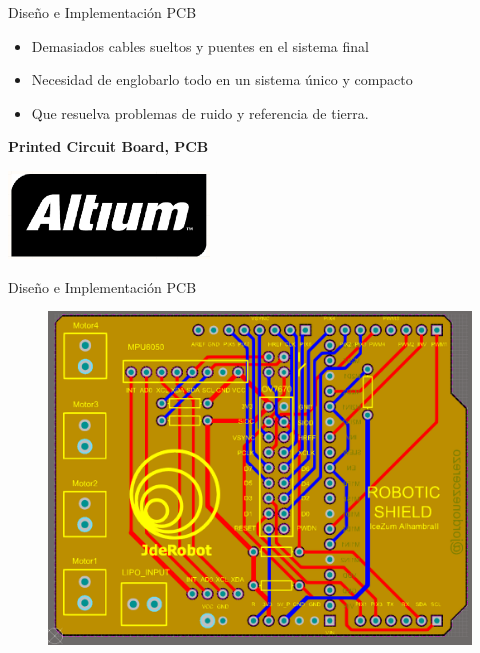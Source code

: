 \documentclass{beamer}
\begin{document}
\begin{frame}{Diseño e Implementación PCB}
\begin{block}{}
	\begin{itemize}
		\item Demasiados cables sueltos y puentes en el sistema final \pause
		\item Necesidad de englobarlo todo en un sistema único y compacto \pause
		\item Que resuelva problemas de ruido y referencia de tierra. \pause
	\end{itemize}
\end{block}
\begin{alertblock}{}
	\centering \textbf{Printed Circuit Board, PCB} \pause
	\begin{center}
		\includegraphics [width =0.4\textwidth ]{imagenes/altium}
	\end{center}
\end{alertblock}
\end{frame}

\begin{frame}{Diseño e Implementación PCB}
\begin{figure}[H]
	\center
	\includegraphics[scale=0.35, angle=0]{imagenes/Balancing_Robot/layers_altium.PNG}
\end{figure}
\end{frame}
\end{document}
